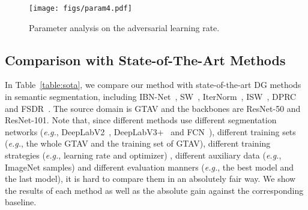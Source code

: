 \documentclass{article}
\begin{document}
\begin{figure}[t]
\centering
\texttt{[image: figs/param4.pdf]}
\caption{Parameter analysis on the adversarial learning rate.}
\label{fig:parameter}
\end{figure}





\subsection{Comparison with State-of-The-Art Methods}

In Table~\ref{table:sota}, we compare our method with state-of-the-art DG methods in semantic segmentation, including IBN-Net~\cite{ibn}, SW~\cite{pan2019switchable}, IterNorm~\cite{huang2019iterative}, ISW~\cite{robustnet}, DPRC~\cite{DRPC} and FSDR~\cite{FSDR}. The source domain is GTAV and the backbones are ResNet-50 and ResNet-101. Note that, since different methods use different segmentation networks (\textit{e.g.}, DeepLabV2~\cite{chen2018deeplab}, DeepLabV3+~\cite{deeplab} and FCN~\cite{long2015fully}), different training sets (\textit{e.g.}, the whole GTAV and the training set of GTAV), different training 
strategies (\textit{e.g.}, learning rate and optimizer) , different auxiliary data (\textit{e.g.}, ImageNet samples) and different evaluation manners (\textit{e.g.}, the best model and the last model), it is hard to compare them in an absolutely fair way. We show the results of each method as well as the absolute gain against the corresponding baseline. 
\end{document}
